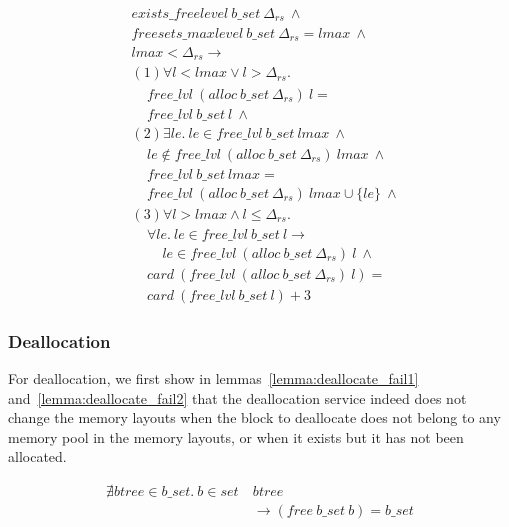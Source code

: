 \begin{lemma} 
	\label{lemma:free_indirectalloc}
\end{lemma}
\vspace{-7pt}
\begin{align*}
&exists\_freelevel\ b\_set\ \Delta_{rs}\ \wedge\\
&freesets\_maxlevel\ b\_set\ \Delta_{rs} = lmax\ \wedge\\
&lmax < \Delta_{rs} \longrightarrow\\
&(1) \forall l < lmax \vee l > \Delta_{rs}.\\
&\ \ \ \ \ free\_lvl\ (alloc\ b\_set\ \Delta_{rs})\ l =\\
&\ \ \ \ \ free\_lvl\ b\_set\ l\ \wedge\\
&(2) \exists le.\ le \in free\_lvl\ b\_set\ lmax\ \wedge\\
&\ \ \ \ \ le \notin free\_lvl\ (alloc\ b\_set\ \Delta_{rs})\ lmax\ \wedge\\
&\ \ \ \ \ free\_lvl\ b\_set\ lmax =\\
&\ \ \ \ \ free\_lvl\ (alloc\ b\_set\ \Delta_{rs})\ lmax \cup \lbrace le \rbrace\ \wedge\\
&(3) \forall l > lmax \wedge l \le \Delta_{rs}.\\
&\ \ \ \ \ \forall le.\ le \in free\_lvl\ b\_set\ l \longrightarrow\\
&\ \ \ \ \ \ \ \ \ \ le \in free\_lvl\ (alloc\ b\_set\ \Delta_{rs})\ l\ \wedge\\
&\ \ \ \ \ card\ (free\_lvl\ (alloc\ b\_set\ \Delta_{rs})\ l) =\\
&\ \ \ \ \ card\ (free\_lvl\ b\_set\ l) + 3
\end{align*}

\subsubsection{Deallocation}\label{sec:functionalDealloc}
For deallocation, we first show in lemmas~\ref{lemma:deallocate_fail1} and~\ref{lemma:deallocate_fail2} that the deallocation service indeed does not change the memory layouts when the block to deallocate does not belong to any memory pool in the memory layouts, or when it exists but it has not been allocated.

\begin{lemma} 
\label{lemma:deallocate_fail1}
\begin{align*}
\nexists btree \in b\_set.\ b \in set\ &btree\\
&\longrightarrow (free\ b\_set\ b) = b\_set
\end{align*}
\end{lemma}
	
